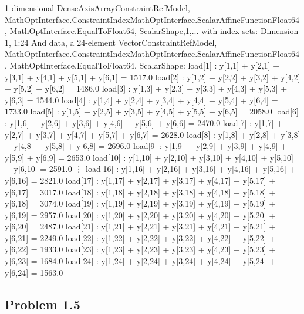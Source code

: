 \documentclass[12pt,a4paper]{article}
\begin{document}
1-dimensional DenseAxisArray{ConstraintRef{Model, MathOptInterface.ConstraintIndex{MathOptInterface.ScalarAffineFunction{Float64}, MathOptInterface.EqualTo{Float64}}, ScalarShape},1,...} with index sets:
    Dimension 1, 1:24
And data, a 24-element Vector{ConstraintRef{Model, MathOptInterface.ConstraintIndex{MathOptInterface.ScalarAffineFunction{Float64}, MathOptInterface.EqualTo{Float64}}, ScalarShape}}:
 load[1] : y[1,1] + y[2,1] + y[3,1] + y[4,1] + y[5,1] + y[6,1] = 1517.0
 load[2] : y[1,2] + y[2,2] + y[3,2] + y[4,2] + y[5,2] + y[6,2] = 1486.0
 load[3] : y[1,3] + y[2,3] + y[3,3] + y[4,3] + y[5,3] + y[6,3] = 1544.0
 load[4] : y[1,4] + y[2,4] + y[3,4] + y[4,4] + y[5,4] + y[6,4] = 1733.0
 load[5] : y[1,5] + y[2,5] + y[3,5] + y[4,5] + y[5,5] + y[6,5] = 2058.0
 load[6] : y[1,6] + y[2,6] + y[3,6] + y[4,6] + y[5,6] + y[6,6] = 2470.0
 load[7] : y[1,7] + y[2,7] + y[3,7] + y[4,7] + y[5,7] + y[6,7] = 2628.0
 load[8] : y[1,8] + y[2,8] + y[3,8] + y[4,8] + y[5,8] + y[6,8] = 2696.0
 load[9] : y[1,9] + y[2,9] + y[3,9] + y[4,9] + y[5,9] + y[6,9] = 2653.0
 load[10] : y[1,10] + y[2,10] + y[3,10] + y[4,10] + y[5,10] + y[6,10] = 2591.0
 ⋮
 load[16] : y[1,16] + y[2,16] + y[3,16] + y[4,16] + y[5,16] + y[6,16] = 2821.0
 load[17] : y[1,17] + y[2,17] + y[3,17] + y[4,17] + y[5,17] + y[6,17] = 3017.0
 load[18] : y[1,18] + y[2,18] + y[3,18] + y[4,18] + y[5,18] + y[6,18] = 3074.0
 load[19] : y[1,19] + y[2,19] + y[3,19] + y[4,19] + y[5,19] + y[6,19] = 2957.0
 load[20] : y[1,20] + y[2,20] + y[3,20] + y[4,20] + y[5,20] + y[6,20] = 2487.0
 load[21] : y[1,21] + y[2,21] + y[3,21] + y[4,21] + y[5,21] + y[6,21] = 2249.0
 load[22] : y[1,22] + y[2,22] + y[3,22] + y[4,22] + y[5,22] + y[6,22] = 1933.0
 load[23] : y[1,23] + y[2,23] + y[3,23] + y[4,23] + y[5,23] + y[6,23] = 1684.0
 load[24] : y[1,24] + y[2,24] + y[3,24] + y[4,24] + y[5,24] + y[6,24] = 1563.0


\subsection{Problem 1.5}
\end{document}
